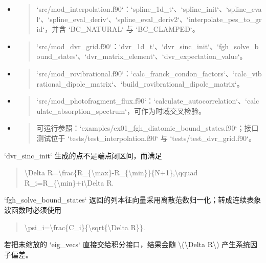 \documentclass[UTF8,openany,11pt,fontset=fandol]{ctexbook}
\begin{document}
\begin{itemize}
\item
  \begin{quote}
  `src/mod\_interpolation.f90`：`spline\_1d\_t`、`spline\_init`、`spline\_eval`、`spline\_eval\_deriv`、`spline\_eval\_deriv2`、`interpolate\_pes\_to\_grid`，并含
  `BC\_NATURAL` 与 `BC\_CLAMPED`。
  \end{quote}
\item
  \begin{quote}
  `src/mod\_dvr\_grid.f90`：`dvr\_1d\_t`、`dvr\_sinc\_init`、`fgh\_solve\_bound\_states`、`dvr\_matrix\_element`、`dvr\_expectation\_value`。
  \end{quote}
\item
  \begin{quote}
  `src/mod\_rovibrational.f90`：`calc\_franck\_condon\_factors`、`calc\_vibrational\_dipole\_matrix`、`build\_rovibrational\_dipole\_matrix`。
  \end{quote}
\item
  \begin{quote}
  `src/mod\_photofragment\_flux.f90`：`calculate\_autocorrelation`、`calculate\_absorption\_spectrum`，可作为时域交叉检验。
  \end{quote}
\item
  \begin{quote}
  可运行参照：`examples/ex01\_fgh\_diatomic\_bound\_states.f90`；接口测试位于
  `tests/test\_interpolation.f90` 与 `tests/test\_dvr\_grid.f90`。
  \end{quote}
\end{itemize}

`dvr\_sinc\_init` 生成的点不是端点闭区间，而满足

\begin{quote}
\textbackslash Delta
R=\textbackslash frac\{R\_\{\textbackslash max\}-R\_\{\textbackslash min\}\}\{N+1\},\textbackslash qquad
R\_i=R\_\{\textbackslash min\}+i\textbackslash Delta R.
\end{quote}

`fgh\_solve\_bound\_states`
返回的列本征向量采用离散范数归一化；转成连续表象波函数时必须使用

\begin{quote}
\textbackslash psi\_i=\textbackslash frac\{C\_i\}\{\textbackslash sqrt\{\textbackslash Delta
R\}\}.
\end{quote}

若把未缩放的 `eig\_vecs` 直接交给积分接口，结果会随
\textbackslash(\textbackslash Delta R\textbackslash) 产生系统因子偏差。
\end{document}
